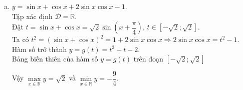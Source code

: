 \begin{bt}
{\begin{enumerate}[a)]
\begin{eqnarray*}
				      &\Leftrightarrow&-1\leq \left( \cos^2 x+1\right)^2-2\leq 2.
			      \end{eqnarray*}
			      Vậy $\max\limits_{x \in \mathbb{R}} y=2$ khi $x=k\pi$, $k\in \mathbb{Z}$ và $\min\limits_{x \in \mathbb{R}} y=-1$ khi $x=\dfrac{\pi}{2}+k\pi$, $k\in \mathbb{Z}$.
			\item $y=\sin x+\cos x+2 \sin x \cos x-1$.\\
			      Tập xác định $\mathscr{D}=\mathbb{R}$.\\
			      Đặt $t=\sin x+ \cos x=\sqrt{2}\sin \left(x+\dfrac{\pi}{4}\right)$, $t\in \left[-\sqrt{2};\sqrt{2}\right]$.\\
			      Ta có $t^2=\left(\sin x+ \cos x\right)^2=1+2\sin x\cos x\Rightarrow 2\sin x\cos x =t^2-1$.\\
			      Hàm số trở thành $y=g(t)=t^2+t-2$. \\
			      Bảng biến thiên của hàm số $y=g(t)$ trên đoạn $ \left[-\sqrt{2};\sqrt{2}\right]$
			      \begin{center}
			      \end{center}
			      Vậy $\max\limits_{x \in \mathbb{R}} y=\sqrt{2}$ và $\min\limits_{x \in \mathbb{R}} y=-\dfrac{9}{4}$.
		\end{enumerate}
	}
\end{bt}

